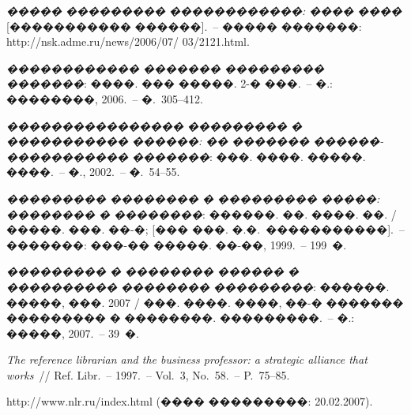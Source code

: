 \documentclass[11pt]{ubs}
\begin{document}
\begin{thebibliography}{10}
  \textit{����� ��������� ������������: ���� ����} [����������� ������].~-- ����� �������: http://nsk.adme.ru/news/2006/07/ 03/2121.html.

   \textit{������������ ������� ��������� �������}: ����. ��� �����. 2-� ���.~-- �.: ��������, 2006.~-- �.~305--412.

   \textit{���������������� ��������� � ����������� ������: �� ������� ������-����������� �������}: ���. ����. �����. ����.~-- �., 2002.~-- �.~54--55.

  \textit{��������� �������� � ��������� �����: �������� � ��������}: ������. ��. ����. ��. / �����. ���. ��-�; [��� ���. �.�.~�����������].~-- �������: ���-�� �����. ��-��, 1999.~-- 199~�.

  \textit{��������� � �������� ������ � ���������� �������� ���������}: ������. �����, ���. 2007 / ���. ����. ����, ��-� ������� ��������� � ��������. ���������.~-- �.: �����, 2007.~-- 39~�.

   \textit{The reference librarian and the business professor: a strategic alliance that works}~// Ref. Libr.~-- 1997.~-- Vol.~3, No.~58.~-- P.~75--85.

  http://www.nlr.ru/index.html (���� ���������: 20.02.2007).

\end{thebibliography}
\newpage
\makeenginfo
\makeauxinfo
\end{document}
